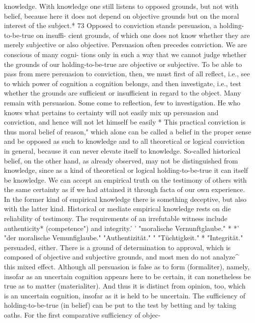 knowledge. With knowledge one still listens to opposed grounds, but not
with belief, because here it does not depend on objective grounds but on
the moral interest of the subject.*
73
Opposed to conviction stands persuasion, a holding-to-be-true on insuffi-
cient grounds, of which one does not know whether they are merely
subjective or also objective.
Persuasion often precedes conviction. We are conscious of many cogni-
tions only in such a way that we cannot judge whether the grounds of our
holding-to-be-true are objective or subjective. To be able to pass from
mere persuasion to conviction, then, we must first of all reflect, i.e., see to
which power of cognition a cognition belongs, and then investigate, i.e.,
test whether the grounds are sufficient or insufficient in regard to the
object. Many remain with persuasion. Some come to reflection, few to
investigation. He who knows what pertains to certainty will not easily mix
up persuasion and conviction, and hence will not let himself be easily
* This practical conviction is thus moral belief of reason," which alone can be called a belief in
the proper sense and be opposed as such to knowledge and to all theoretical or logical
conviction in general, because it can never elevate itself to knowledge. So-called historical
belief, on the other hand, as already observed, may not be distinguished from knowledge,
since as a kind of theoretical or logical holding-to-be-true it can itself be knowledge. We can
accept an empirical truth on the testimony of others with the same certainty as if we had
attained it through facta of our own experience. In the former kind of empirical knowledge
there is something deceptive, but also with the latter kind.
Historical or mediate empirical knowledge rests on die reliability of testimony. The
requirements of an irrefutable witness include authenticity* (competence") and integrity.'
' "moralische Vernunftglaube."
*
*' "der moralische Vemunfiglaube."
"Authentizität."
" "Tüchtigkeit."
* "Integrität."
persuaded, either. There is a ground of determination to approval, which
is composed of objective and subjective grounds, and most men do not
analyze^ this mixed effect.
Although all persuasion is false as to form (formaliter), namely, insofar
as an uncertain cognition appears here to be certain, it can nonetheless be
true as to matter (materialiter). And thus it is distinct from opinion, too,
which is an uncertain cognition, insofar as it is held to be uncertain.
The sufficiency of holding-to-be-true (in belief) can be put to the test
by betting and by taking oaths. For the first comparative sufficiency of objec-

